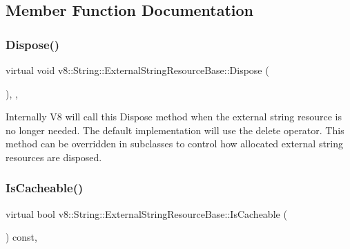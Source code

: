 \subsection{Member Function Documentation}
\mbox{\label{classv8_1_1String_1_1ExternalStringResourceBase_af4720342ae31e1ab4656df3f15d069c0}} 
\subsubsection{\texorpdfstring{Dispose()}{Dispose()}}
{\footnotesize\ttfamily virtual void v8\+::\+String\+::\+External\+String\+Resource\+Base\+::\+Dispose (\begin{DoxyParamCaption}{ }\end{DoxyParamCaption})\hspace{0.3cm}{\ttfamily [inline]}, {\ttfamily [protected]}, {\ttfamily [virtual]}}

Internally V8 will call this Dispose method when the external string resource is no longer needed. The default implementation will use the delete operator. This method can be overridden in subclasses to control how allocated external string resources are disposed. \mbox{\label{classv8_1_1String_1_1ExternalStringResourceBase_a994c7580185c831abd45075d297dd07c}} 
\subsubsection{\texorpdfstring{Is\+Cacheable()}{IsCacheable()}}
{\footnotesize\ttfamily virtual bool v8\+::\+String\+::\+External\+String\+Resource\+Base\+::\+Is\+Cacheable (\begin{DoxyParamCaption}{ }\end{DoxyParamCaption}) const\hspace{0.3cm}{\ttfamily [inline]}, {\ttfamily [virtual]}}


